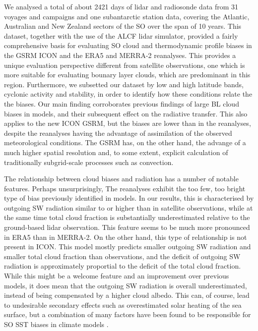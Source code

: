 \documentclass[12pt,a4paper]{article}
\begin{document}
We analysed a total of about 2421 days of lidar and radiosonde data from 31
voyages and campaigns and one subantarctic station data, covering the Atlantic,
Australian and New Zealand sectors of the SO over the span of 10 years. This
dataset, together with the use of the ALCF lidar simulator, provided a fairly
comprehensive basis for evaluating SO cloud and thermodynamic profile biases in
the GSRM ICON and the ERA5 and MERRA-2 reanalyses. This provides a unique
evaluation perspective different from satellite observations, one which is more
suitable for evaluating bounary layer clouds, which are predominant in this
region. Furthermore, we subsetted our dataset by low and high latitude bands,
cyclonic activity and stability, in order to identify how these conditions
relate the the biases. Our main finding corroborates previous findings of large
BL cloud biases in models, and their subsequent effect on the radiative
transfer. This also applies to the new ICON GSRM, but the biases are lower than
in the reanalyses, despite the reanalyses having the advantage of assimilation
of the observed meteorological conditions.  The GSRM has, on the other hand,
the advange of a much higher spatial resolution and, to some extent, explicit
calculation of traditionally subgrid-scale processes such as convection.

The relationship between cloud biases and radiation has a number of notable
features. Perhaps unsurprisingly, The reanalyses exhibit the too few,
too bright type of bias previously identified in models. In our results,
this is characterised by outgoing SW radiation similar to or higher
than in satellite observations, while at the same time total cloud fraction
is substantially underestimated relative to the ground-based lidar observation.
This feature seems to be much more pronounced in ERA5 than in MERRA-2. On
the other hand, this type of relationship is not present in ICON. This model
mostly predicts smaller outgoing SW radiation and smaller total cloud fraction
than observations, and the deficit of outgoing SW radiation is approximately
proportial to the deficit of the total cloud fraction. While this might be a
welcome feature and an improvement over previous models, it does mean that the
outgoing SW radiation is overall underestimated, instead of being compensated
by a higher cloud albedo. This can, of course, lead to undesirable secondary
effects such as overestimated solar heating of the sea surface, but a
combination of many factors have been found to be responsible for SO SST biases
in climate models \citep{zhang2023,luo2023}.
\end{document}
